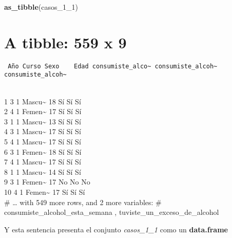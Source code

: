 \documentclass[
]{article}
\newenvironment{Shaded}{\begin{snugshade}}{\end{snugshade}}
\newcommand{\DecValTok}[1]{\textcolor[rgb]{0.00,0.00,0.81}{#1}}
\newcommand{\KeywordTok}[1]{\textcolor[rgb]{0.13,0.29,0.53}{\textbf{#1}}}
\newcommand{\NormalTok}[1]{#1}
\begin{document}
\begin{Shaded}
\begin{Highlighting}[]
\KeywordTok{as_tibble}\NormalTok{(casos_}\DecValTok{1}\NormalTok{_}\DecValTok{1}\NormalTok{)}
\end{Highlighting}
\end{Shaded}

\hypertarget{a-tibble-559-x-9}{%
\section{A tibble: 559 x 9}\label{a-tibble-559-x-9}}

\begin{verbatim}
 Año Curso Sexo    Edad consumiste_alco~ consumiste_alcoh~ consumiste_alcoh~
\end{verbatim}

\\
1 3 1 Mascu\textasciitilde{} 18 Sí Sí Sí\\
2 4 1 Femen\textasciitilde{} 17 Sí Sí Sí\\
3 1 1 Mascu\textasciitilde{} 13 Sí Sí Sí\\
4 3 1 Mascu\textasciitilde{} 17 Sí Sí Sí\\
5 4 1 Mascu\textasciitilde{} 17 Sí Sí Sí\\
6 3 1 Femen\textasciitilde{} 18 Sí Sí Sí\\
7 4 1 Mascu\textasciitilde{} 17 Sí Sí Sí\\
8 1 1 Mascu\textasciitilde{} 14 Sí Sí Sí\\
9 3 1 Femen\textasciitilde{} 17 No No No\\
10 4 1 Femen\textasciitilde{} 17 Sí Sí Sí\\
\# \ldots{} with 549 more rows, and 2 more variables: \#
consumiste\_alcohol\_esta\_semana , tuviste\_un\_exceso\_de\_alcohol

Y esta sentencia presenta el conjunto \emph{casos\_1\_1} como un
\textbf{data.frame}
\end{document}

